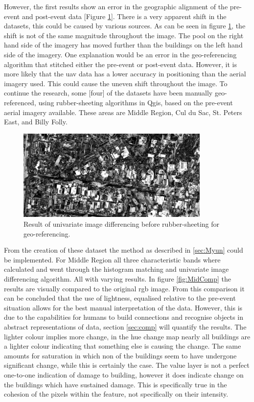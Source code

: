\noindent However, the first results show an error in the geographic alignment of the pre-event and post-event data [Figure \ref{fig:all}]. There is a very apparent shift in the datasets, this could be caused by various sources. As can be seen in figure \ref{fig:all}, the shift is not of the same magnitude throughout the image. The pool on the right hand side of the imagery has moved further than the buildings on the left hand side of the imagery. One explanation would be an error in the geo-referencing algorithm that stitched either the pre-event or post-event data. However, it is more likely that the \ac{uav} data has a lower accuracy in positioning than the aerial imagery used. This could cause the uneven shift throughout the image. To continue the research, some [four] of the datasets have been manually geo-referenced, using rubber-sheeting algorithms in Qgis, based on the pre-event aerial imagery available. These areas are Middle Region, Cul du Sac, St. Peters East, and Billy Folly.\\

\begin{figure}[!h]
	\centering
	\captionsetup{justification=raggedright,singlelinecheck=false}
	\includegraphics[width=0.85\textwidth]{figs/allignment.png}
	\caption{\footnotesize{Result of univariate image differencing before rubber-sheeting for geo-referencing.}}
	\label{fig:all}
\end{figure}

\noindent From the creation of these dataset the method as described in \ref{sec:Myun} could be implemented. For Middle Region all three characteristic bands where calculated and went through the histogram matching and univariate image differencing algorithm. All with varying results. In figure \ref{fig:MidComp} the results are visually compared to the original \ac{rgb} image. From this comparison it can be concluded that the use of lightness, equalised relative to the pre-event situation allows for the best manual interpretation of the data. However, this is due to the capabilities for humans to build connections and recognise objects in abstract representations of data, section \ref{sec:comp} will quantify the results. The lighter colour implies more change, in the hue change map nearly all buildings are a lighter colour indicating that something else is causing the change. The same amounts for saturation in which non of the buildings seem to have undergone significant change, while this is certainly the case. The value layer is not a perfect one-to-one indication of damage to building, however it does indicate change on the buildings which have sustained damage. This is specifically true in the cohesion of the pixels within the feature, not specifically on their intensity.

